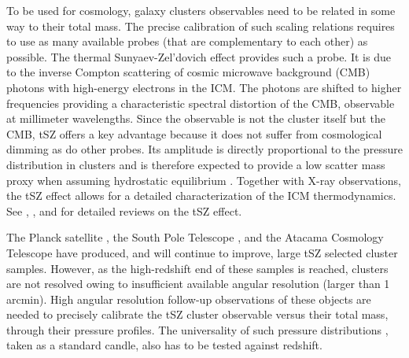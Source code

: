 \documentclass[twocolumn,traditabstract]{aa}
\begin{document}
To be used for cosmology, galaxy clusters observables need to be related in some way to their total mass. The precise calibration of such scaling relations requires to use as many available probes (that are complementary to each other) as possible. The thermal Sunyaev-Zel'dovich \citep[tSZ,][]{sunyaev1972,sunyaev1980} effect provides such a probe. It is due to the inverse Compton scattering of cosmic microwave background (CMB) photons with high-energy electrons in the ICM. The photons are shifted to higher frequencies providing a characteristic spectral distortion of the CMB, observable at millimeter wavelengths. Since the observable is not the cluster itself but the CMB, tSZ offers a key advantage because it does not suffer from cosmological dimming as do other probes. Its amplitude is directly proportional to the pressure distribution in clusters and is therefore expected to provide a low scatter mass proxy when assuming hydrostatic equilibrium \citep[e.g.,][]{nagai2006}. Together with X-ray observations, the tSZ effect allows for a detailed characterization of the ICM thermodynamics. See \cite{birkinshaw1999}, \cite{carlstrom2002}, and \cite{kitayama2014} for detailed reviews on the tSZ effect.

The Planck satellite \citep{planck2013catalogue}, the South Pole Telescope \citep[SPT,][]{reichardt2013,bleem2014}, and the Atacama Cosmology Telescope \citep[ACT,][]{hasselfield2013} have produced, and will continue to improve, large tSZ selected cluster samples. However, as the high-redshift end of these samples is reached, clusters are not resolved owing to insufficient available angular resolution (larger than 1 arcmin). High angular resolution follow-up observations of these objects are needed to precisely calibrate the tSZ cluster observable versus their total mass, through their pressure profiles. The universality of such pressure distributions \citep{planck2013pressure_profile, arnaud2010}, taken as a standard candle, also has to be tested against redshift.
\end{document}
